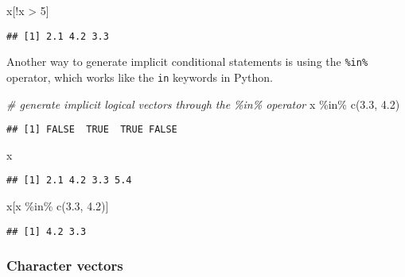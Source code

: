 \documentclass[
]{book}
\newenvironment{Shaded}{\begin{snugshade}}{\end{snugshade}}
\newcommand{\CommentTok}[1]{\textcolor[rgb]{0.56,0.35,0.01}{\textit{#1}}}
\newcommand{\DecValTok}[1]{\textcolor[rgb]{0.00,0.00,0.81}{#1}}
\newcommand{\FloatTok}[1]{\textcolor[rgb]{0.00,0.00,0.81}{#1}}
\newcommand{\FunctionTok}[1]{\textcolor[rgb]{0.00,0.00,0.00}{#1}}
\newcommand{\NormalTok}[1]{#1}
\newcommand{\SpecialCharTok}[1]{\textcolor[rgb]{0.00,0.00,0.00}{#1}}
\begin{document}
\begin{Shaded}
\begin{Highlighting}[]
\NormalTok{x[}\SpecialCharTok{!}\NormalTok{x }\SpecialCharTok{\textgreater{}} \DecValTok{5}\NormalTok{]}
\end{Highlighting}
\end{Shaded}

\begin{verbatim}
## [1] 2.1 4.2 3.3
\end{verbatim}

Another way to generate implicit conditional statements is using the \texttt{\%in\%} operator, which works like the \texttt{in} keywords in Python.

\begin{Shaded}
\begin{Highlighting}[]
\CommentTok{\# generate implicit logical vectors through the \%in\% operator}
\NormalTok{x }\SpecialCharTok{\%in\%} \FunctionTok{c}\NormalTok{(}\FloatTok{3.3}\NormalTok{, }\FloatTok{4.2}\NormalTok{)}
\end{Highlighting}
\end{Shaded}

\begin{verbatim}
## [1] FALSE  TRUE  TRUE FALSE
\end{verbatim}

\begin{Shaded}
\begin{Highlighting}[]
\NormalTok{x}
\end{Highlighting}
\end{Shaded}

\begin{verbatim}
## [1] 2.1 4.2 3.3 5.4
\end{verbatim}

\begin{Shaded}
\begin{Highlighting}[]
\NormalTok{x[x }\SpecialCharTok{\%in\%} \FunctionTok{c}\NormalTok{(}\FloatTok{3.3}\NormalTok{, }\FloatTok{4.2}\NormalTok{)]}
\end{Highlighting}
\end{Shaded}

\begin{verbatim}
## [1] 4.2 3.3
\end{verbatim}

\hypertarget{character-vectors}{%
\subsubsection{Character vectors}\label{character-vectors}}
\end{document}
